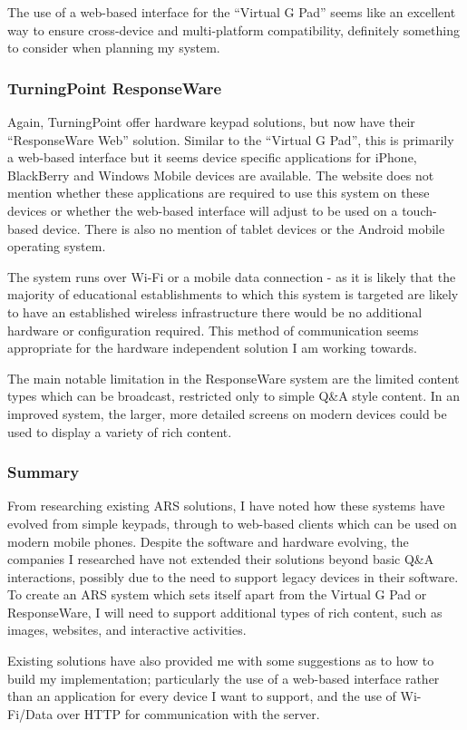 \documentclass[a4papert,11pt,notitlepage]{ltxdoc}
\begin{document}
The use of a web-based interface for the ``Virtual G Pad'' seems like an excellent way to ensure cross-device and multi-platform compatibility, definitely something to consider when planning my system.

\subsubsection{TurningPoint ResponseWare}
Again, TurningPoint offer hardware keypad solutions, but now have their ``ResponseWare Web'' solution. Similar to the ``Virtual G Pad'', this is primarily a web-based interface but it seems device specific applications for iPhone, BlackBerry and Windows Mobile devices are available. The website does not mention whether these applications are required to use this system on these devices or whether the web-based interface will adjust to be used on a touch-based device. There is also no mention of tablet devices or the Android mobile operating system.

The system runs over Wi-Fi or a mobile data connection - as it is likely that the majority of educational establishments to which this system is targeted are likely to have an established wireless infrastructure there would be no additional hardware or configuration required. This method of communication seems appropriate for the hardware independent solution I am working towards.

The main notable limitation in the ResponseWare system are the limited content types which can be broadcast, restricted only to simple Q\&A style content. In an improved system, the larger, more detailed screens on modern devices could be used to display a variety of rich content.

\subsubsection{Summary}
From researching existing ARS solutions, I have noted how these systems have evolved from simple keypads, through to web-based clients which can be used on modern mobile phones. Despite the software and hardware evolving, the companies I researched have not extended their solutions beyond basic Q\&A interactions, possibly due to the need to support legacy devices in their software. To create an ARS system which sets itself apart from the Virtual G Pad or ResponseWare, I will need to support additional types of rich content, such as images, websites, and interactive activities.

Existing solutions have also provided me with some suggestions as to how to build my implementation; particularly the use of a web-based interface rather than an application for every device I want to support, and the use of Wi-Fi/Data over HTTP for communication with the server.
\end{document}
